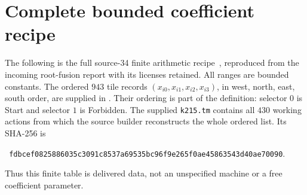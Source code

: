 \section{Complete bounded coefficient recipe}\label{app:coeff}

The following is the full source-34 finite arithmetic recipe~\cite{coeff},
reproduced from the incoming root-fusion report with its licenses retained.
All ranges are bounded constants. The ordered \(943\) tile records
\((x_{i0},x_{i1},x_{i2},x_{i3})\), in west, north, east, south order,
are supplied in
.
Their ordering is part of the definition: selector \(0\) is Start
and selector \(1\) is Forbidden.
The supplied \texttt{k215.tm} contains all \(430\) working actions
from which the source builder reconstructs the whole ordered list.
Its SHA-256 is
\begin{center}\small\texttt{
fdbcef0825886035c3091c8537a69535bc96f9e265f0ae45863543d40ae70090}.
\end{center}
Thus this finite table is delivered data, not an unspecified machine
or a free coefficient parameter.

